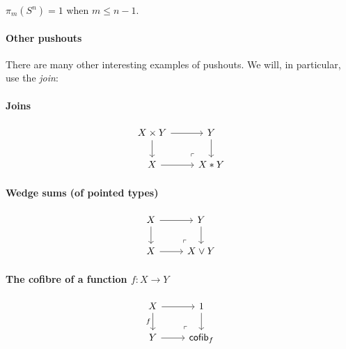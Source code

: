 \documentclass[10pt,oneside,leqno,openright]{memoir}
\begin{document}
\begin{corollary}
    $\pi_m(S^n) = 1$ when $m \leq n-1$.  
\end{corollary}

\paragraph{Other pushouts}
There are many other interesting examples of pushouts. We will, in particular, use the \emph{join}:
%
\paragraph{Joins}
\[\begin{tikzcd}[ampersand replacement=\&]
	{X \times Y} \& Y \\
	X \& {X*Y}
	\arrow[from=1-1, to=1-2]
	\arrow[from=1-1, to=2-1]
	\arrow[from=1-2, to=2-2]
	\arrow[from=2-1, to=2-2]
	\arrow["\lrcorner"{anchor=center, pos=0.125, rotate=180}, draw=none, from=2-2, to=1-1]
\end{tikzcd}\]
%
\paragraph{Wedge sums (of pointed types)}
\[\begin{tikzcd}[ampersand replacement=\&]
	X \& Y \\
	X \& {X\vee Y}
	\arrow[from=1-1, to=1-2]
	\arrow[from=1-1, to=2-1]
	\arrow[from=1-2, to=2-2]
	\arrow[from=2-1, to=2-2]
	\arrow["\lrcorner"{anchor=center, pos=0.125, rotate=180}, draw=none, from=2-2, to=1-1]
\end{tikzcd}\]
%
\paragraph{The cofibre of a function $f: X \to Y$}
\[\begin{tikzcd}[ampersand replacement=\&]
	X \& 1 \\
	Y \& {\mathsf{cofib}_f}
	\arrow[from=1-1, to=1-2]
	\arrow["f"', from=1-1, to=2-1]
	\arrow[from=1-2, to=2-2]
	\arrow[from=2-1, to=2-2]
	\arrow["\lrcorner"{anchor=center, pos=0.125, rotate=180}, draw=none, from=2-2, to=1-1]
\end{tikzcd}\]
\end{document}

